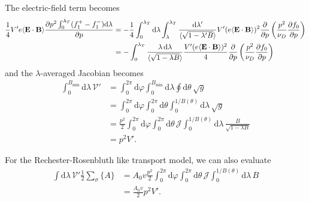 \documentclass[11pt,a4paper]{article}
\newcommand{\rd}{\ensuremath{\mathrm{d}}}
\newcommand{\sub}[1]{\ensuremath{_{\text{#1}}}}
\renewcommand{\b}[1]{\ensuremath{ {\bf #1 } }}
\begin{document}
The electric-field term becomes
\begin{align}
\frac{1}{4} V' e\langle \b{E}\cdot\b{B}\rangle \frac{\partial p^2\int_0^{\lambda_T}(f_1^+-f_1^-)\rd\lambda}{\partial p} &= -\frac{1}{4}\int_0^{\lambda_T}\rd \lambda \int_\lambda^{\lambda_T} \frac{\rd \lambda'}{\langle\sqrt{1-\lambda' B}\rangle} V'(e\langle \b{E}\cdot\b{B}\rangle)^2\frac{\partial}{\partial p} \left(\frac{p^2}{\nu_D} \frac{\partial f_0}{\partial p}\right) \nonumber \\
&= -\int_0^{\lambda_T}\frac{\lambda\,\rd \lambda}{\langle\sqrt{1-\lambda B}\rangle} \frac{V'(e\langle \b{E}\cdot\b{B}\rangle)^2}{4} \frac{\partial}{\partial p} \left(\frac{p^2}{\nu_D}\frac{\partial f_0}{\partial p}\right) 
\end{align}
and the $\lambda$-averaged Jacobian becomes
\begin{align}
\int_0^{B\sub{min}}\!\! \rd\lambda \,\mathcal{V}' &= \int_0^{2\pi}\rd\varphi \int_0^{B\sub{min}}\rd\lambda \oint \rd \theta \, \sqrt{g} \nonumber \\
&= \int_0^{2\pi} \rd\varphi \int_0^{2\pi}\rd\theta \int_0^{1/B(\theta)}\rd\lambda \,\sqrt{g} \nonumber \\
&= \frac{p^2}{2}\int_0^{2\pi} \rd\varphi \int_0^{2\pi}\rd\theta \,\mathcal{J}\int_0^{1/B(\theta)}\rd\lambda \,\frac{B}{\sqrt{1-\lambda B}} \nonumber \\
&= p^2V'.
\end{align}


For the Rechester-Rosenbluth like transport model, we can also evaluate
\begin{align}
\int \rd \lambda \, \mathcal{V}' \frac{1}{2}\sum_\sigma\{A\} &= A_0 v\frac{p^2}{2}\int_0^{2\pi} \rd\varphi \int_0^{2\pi}\rd\theta \,\mathcal{J}\int_0^{1/B(\theta)}\rd\lambda \, B \nonumber \\
&= \frac{A_0 v}{2}p^2 V'.
\end{align}
\end{document}
